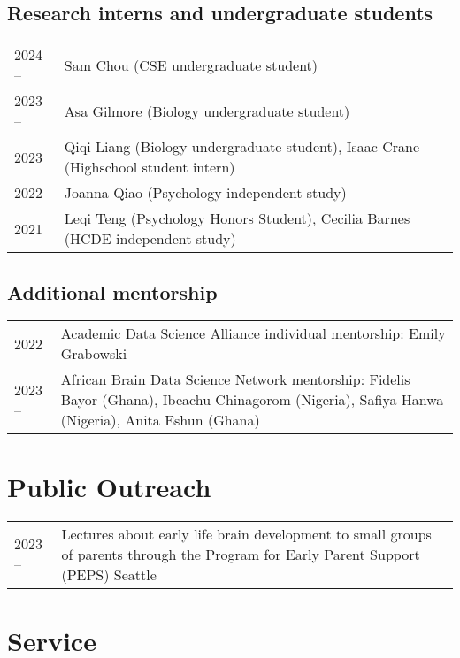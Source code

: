 \documentclass[11pt,fullpage]{article}
\begin{document}
\subsection*{Research interns and undergraduate students}
\begin{tabular}{p{}p{}}
2024 -- & Sam Chou (CSE undergraduate student)\\
2023 -- & Asa Gilmore (Biology undergraduate student)\\
2023 & Qiqi Liang (Biology undergraduate student), Isaac Crane (Highschool student intern)\\
2022 & Joanna Qiao (Psychology independent study) \\
2021 & Leqi Teng (Psychology Honors Student), Cecilia Barnes (HCDE independent study)\\
\end{tabular}

\subsection*{Additional mentorship}
\begin{tabular}{p{}p{}}
2022 & Academic Data Science Alliance individual mentorship: Emily Grabowski\\
2023 -- & African Brain Data Science Network mentorship: Fidelis Bayor (Ghana), Ibeachu Chinagorom (Nigeria), Safiya Hanwa (Nigeria), Anita Eshun (Ghana)\\
\end{tabular}

\section*{Public Outreach}
\begin{tabular}{p{}p{}}
2023 -- & Lectures about early life brain development to small groups of parents through the Program for Early Parent Support (PEPS) Seattle\\
\end{tabular}

\section*{Service}
\end{document}
